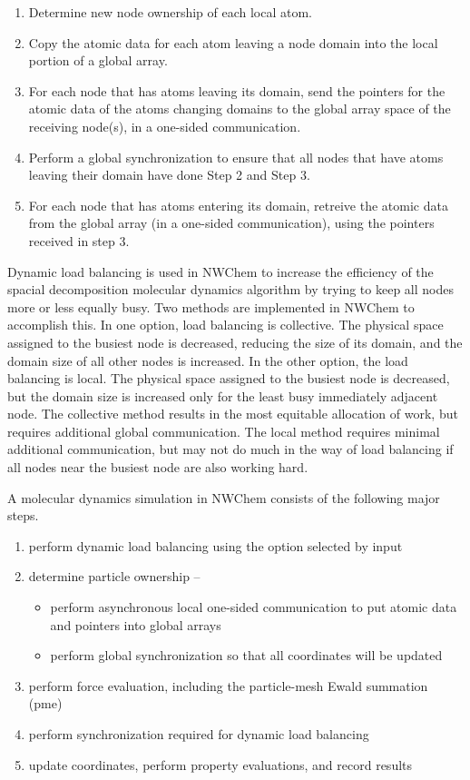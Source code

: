 \begin{enumerate}
\item Determine new node ownership of each local atom.
\item Copy the atomic data for each atom leaving a node domain into the local portion
of a global array.
\item For each node that has atoms leaving its domain, send the
pointers for the atomic data of the atoms changing domains to the global
array space of the receiving node(s), in a one-sided communication.
\item Perform a global synchronization to ensure that all nodes that have
atoms leaving their domain have done
Step 2 and Step 3.
\item For each node that has atoms entering its domain, retreive the atomic data 
from the global array (in a one-sided communication), using the pointers received
in step 3.
\end{enumerate}
 
Dynamic load balancing is used in NWChem to increase the efficiency of the
spacial decomposition molecular dynamics algorithm by trying to keep all nodes
more or less equally busy.  Two methods are implemented in NWChem to accomplish
this.  In one option, load balancing is collective.  The physical space
assigned to the busiest node is decreased, reducing the size of its domain, and 
the domain size of all other nodes is increased.   In the other option, the
load balancing is local.  The physical space assigned to the busiest node
is decreased, but the domain size is increased only for the least busy immediately
adjacent node.  The collective method results in the most equitable allocation
of work, but requires additional global communication.  The local method requires
minimal additional communication, but may not do much in the way of load balancing
if all nodes near the busiest node are also working hard.

A molecular dynamics simulation in NWChem consists of the following major steps.

\begin{enumerate}
\item   perform dynamic load balancing using the option selected by input
\item   determine particle ownership -- 
\begin{itemize}
\item perform asynchronous local one-sided communication to put atomic data and
pointers into global arrays
\item perform global synchronization so that all coordinates will be updated
\end{itemize}
\item   perform force evaluation, including the particle-mesh Ewald summation (pme)
\item   perform synchronization required for dynamic load balancing
\item   update coordinates, perform property evaluations, and record results
\end{enumerate}

